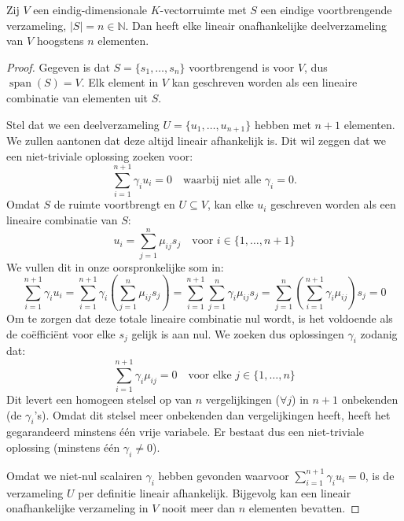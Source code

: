 \begin{lemma}
    Zij $V$ een eindig-dimensionale $K$-vectorruimte met $S$ een eindige voortbrengende verzameling, $|S| = n \in \mathbb{N}$. Dan heeft elke lineair onafhankelijke deelverzameling van $V$ hoogstens $n$ elementen.
\end{lemma}
\begin{proof}
    Gegeven is dat $S = \{s_1, \dots, s_n\}$ voortbrengend is voor $V$, dus $\operatorname{span}(S) = V$. Elk element in $V$ kan geschreven worden als een lineaire combinatie van elementen uit $S$.

    Stel dat we een deelverzameling $U = \{u_1, \dots , u_{n+1}\}$ hebben met $n+1$ elementen. We zullen aantonen dat deze altijd lineair afhankelijk is.
    Dit wil zeggen dat we een niet-triviale oplossing zoeken voor:
    \[
    \sum_{i=1}^{n+1} \gamma_i u_i = 0 \quad \text{waarbij niet alle } \gamma_i = 0.
    \]
    Omdat $S$ de ruimte voortbrengt en $U \subseteq V$, kan elke $u_i$ geschreven worden als een lineaire combinatie van $S$:
    \[
    u_i = \sum_{j=1}^{n} \mu_{ij} s_j \quad \text{voor } i \in \{1, \dots, n+1\} 
    \]
    We vullen dit in onze oorspronkelijke som in:
    \[
        \sum_{i=1}^{n+1} \gamma_i u_i 
        = \sum_{i=1}^{n+1} \gamma_i \left( \sum_{j=1}^{n} \mu_{ij} s_j \right) 
        = \sum_{i=1}^{n+1} \sum_{j=1}^{n} \gamma_i \mu_{ij} s_j 
        = \sum_{j=1}^{n} \left( \sum_{i=1}^{n+1} \gamma_i \mu_{ij} \right) s_j = 0
    \]
    Om te zorgen dat deze totale lineaire combinatie nul wordt,
    is het voldoende als de coëfficiënt voor elke $s_j$ gelijk is aan nul.
    We zoeken dus oplossingen $\gamma_i$ zodanig dat:
    \[ \sum_{i=1}^{n+1} \gamma_i \mu_{ij} = 0 \quad \text{voor elke } j \in \{1, \dots, n\} \]
    Dit levert een homogeen stelsel op van $n$ vergelijkingen ($\forall j$) in $n+1$ onbekenden (de $\gamma_i$'s). 
    Omdat dit stelsel meer onbekenden dan vergelijkingen heeft,
    heeft het gegarandeerd minstens één vrije variabele.
    Er bestaat dus een niet-triviale oplossing (minstens één $\gamma_i \neq 0$).

    Omdat we niet-nul scalairen $\gamma_i$ hebben gevonden waarvoor $\sum_{i=1}^{n+1} \gamma_i u_i = 0$,
    is de verzameling $U$ per definitie lineair afhankelijk.
    Bijgevolg kan een lineair onafhankelijke verzameling in $V$ nooit meer dan $n$ elementen bevatten.
\end{proof}

